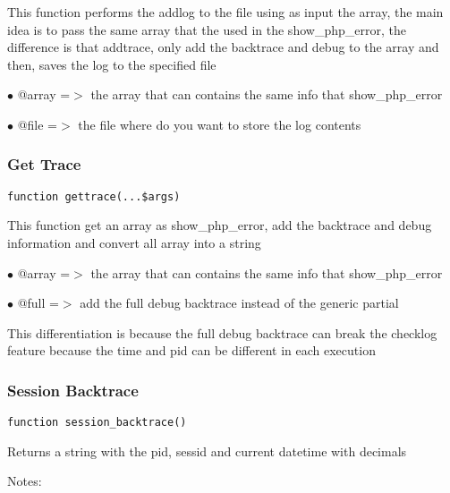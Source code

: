 \documentclass[a4paper]{article}
\begin{document}
This function performs the addlog to the file using as input the array, the
main idea is to pass the same array that the used in the show\_php\_error, the
difference is that addtrace, only add the backtrace and debug to the array
and then, saves the log to the specified file

\begin{compactitem}
\item[\color{myblue}$\bullet$] @array =$>$ the array that can contains the same info that show\_php\_error
\item[\color{myblue}$\bullet$] @file  =$>$ the file where do you want to store the log contents
\end{compactitem}

\hypertarget{toc165}{}
\subsubsection{Get Trace}

\begin{lstlisting}
function gettrace(...$args)
\end{lstlisting}

This function get an array as show\_php\_error, add the backtrace and debug
information and convert all array into a string

\begin{compactitem}
\item[\color{myblue}$\bullet$] @array =$>$ the array that can contains the same info that show\_php\_error
\item[\color{myblue}$\bullet$] @full  =$>$ add the full debug backtrace instead of the generic partial
\end{compactitem}

This differentiation is because the full debug backtrace can break the
checklog feature because the time and pid can be different in each
execution

\hypertarget{toc166}{}
\subsubsection{Session Backtrace}

\begin{lstlisting}
function session_backtrace()
\end{lstlisting}

Returns a string with the pid, sessid and current datetime with decimals

Notes:
\end{document}

